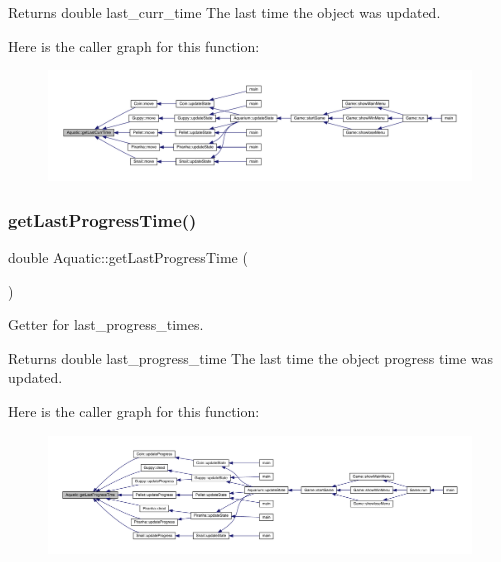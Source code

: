 \begin{DoxyReturn}{Returns}
double last\+\_\+curr\+\_\+time The last time the object was updated. 
\end{DoxyReturn}
Here is the caller graph for this function\+:
\nopagebreak
\begin{figure}[H]
\begin{center}
\leavevmode
\includegraphics[width=350pt]{class_aquatic_aba770b1c9ca9481712a6963e7e8e2919_icgraph}
\end{center}
\end{figure}
\mbox{\label{class_aquatic_a60e1c0f173d0b37adce3cdd3d92efea0}} 
\subsubsection{\texorpdfstring{get\+Last\+Progress\+Time()}{getLastProgressTime()}}
{\footnotesize\ttfamily double Aquatic\+::get\+Last\+Progress\+Time (\begin{DoxyParamCaption}{ }\end{DoxyParamCaption})}



Getter for last\+\_\+progress\+\_\+times. 

\begin{DoxyReturn}{Returns}
double last\+\_\+progress\+\_\+time The last time the object progress time was updated. 
\end{DoxyReturn}
Here is the caller graph for this function\+:
\nopagebreak
\begin{figure}[H]
\begin{center}
\leavevmode
\includegraphics[width=350pt]{class_aquatic_a60e1c0f173d0b37adce3cdd3d92efea0_icgraph}
\end{center}
\end{figure}
\mbox{\label{class_aquatic_a4153178bfefdc57cbcd05fe44054dac9}} 
